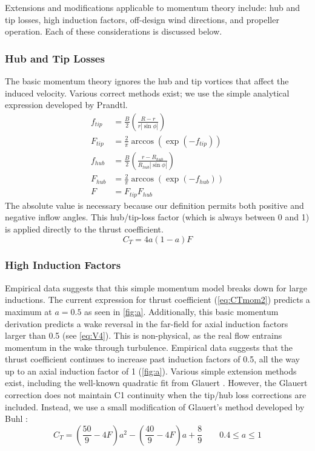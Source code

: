 Extensions and modifications applicable to momentum theory include: hub and tip losses, high induction factors, off-design wind directions, and propeller operation.  Each of these considerations is discussed below.

\subsubsection{Hub and Tip Losses}

The basic momentum theory ignores the hub and tip vortices that affect the induced velocity.  Various correct methods exist; we use the simple analytical expression developed by Prandtl\cite{Glauert1935-Airplane-Propellers}.
\begin{equation}
    \begin{aligned}
    f_{tip} &= \frac{B}{2} \left(\frac{R - r}{r|\sin\phi|} \right)\\
    F_{tip} &= \frac{2}{\pi} \arccos(\exp(-f_{tip}))\\
    f_{hub} &= \frac{B}{2} \left(\frac{r - R_{hub}}{R_{hub}|\sin\phi|} \right)\\
    F_{hub} &= \frac{2}{\pi} \arccos(\exp(-f_{hub}))\\
    F &= F_{tip}F_{hub}
    \end{aligned}
\end{equation}
The absolute value is necessary because our definition permits both positive and negative inflow angles.  This hub/tip-loss factor (which is always between 0 and 1) is applied directly to the thrust coefficient.
\begin{equation}
    C_T = 4 a (1 - a) F
    \label{eq:CTmom2}
\end{equation}

\subsubsection{High Induction Factors}

Empirical data suggests that this simple momentum model breaks down for large inductions.  The current expression for thrust coefficient (\cref{eq:CTmom2}) predicts a maximum at $a = 0.5$ as seen in \cref{fig:a}.  Additionally, this basic momentum derivation predicts a wake reversal in the far-field for axial induction factors larger than 0.5 (see \cref{eq:V4}).  This is non-physical, as the real flow entrains momentum in the wake through turbulence.  Empirical data suggests that the thrust coefficient continues to increase past induction factors of 0.5, all the way up to an axial induction factor of 1 (\cref{fig:a}).  Various simple extension methods exist, including the well-known quadratic fit from Glauert \cite{Glauert1926-General-Theory}.  However, the Glauert correction does not maintain C1 continuity when the tip/hub loss corrections are included.  Instead, we use a small modification of Glauert's method developed by Buhl \cite{Buhl2005-Empirical-Relationship}:
\begin{equation}
C_T = \left(\frac{50}{9} - 4F\right) a^2 - \left(\frac{40}{9} - 4F\right) a + \frac{8}{9} \qquad  0.4 \le a \le 1
\label{eq:CTBuhl}
\end{equation}

